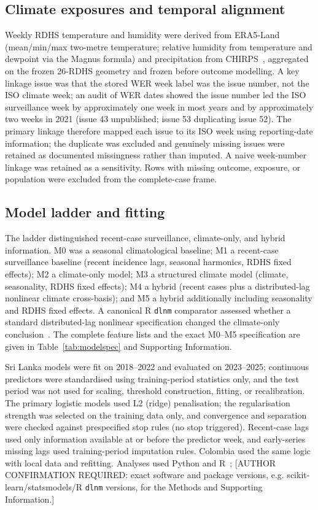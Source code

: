 \documentclass[11pt,a4paper]{article}
\begin{document}
\subsection{Climate exposures and temporal alignment}
Weekly RDHS temperature and humidity were derived from ERA5-Land~\cite{MunozSabater2021,ERA5LandCDS} (mean/min/max two-metre temperature; relative humidity from temperature and dewpoint via the Magnus formula) and precipitation from CHIRPS~\cite{Funk2015,CHIRPS}, aggregated on the frozen 26-RDHS geometry and frozen before outcome modelling. A key linkage issue was that the stored WER week label was the issue number, not the ISO climate week; an audit of WER dates showed the issue number led the ISO surveillance week by approximately one week in most years and by approximately two weeks in 2021 (issue 43 unpublished; issue 53 duplicating issue 52). The primary linkage therefore mapped each issue to its ISO week using reporting-date information; the duplicate was excluded and genuinely missing issues were retained as documented missingness rather than imputed. A naive week-number linkage was retained as a sensitivity. Rows with missing outcome, exposure, or population were excluded from the complete-case frame.

\subsection{Model ladder and fitting}
The ladder distinguished recent-case surveillance, climate-only, and hybrid information. M0 was a seasonal climatological baseline; M1 a recent-case surveillance baseline (recent incidence lags, seasonal harmonics, RDHS fixed effects); M2 a climate-only model; M3 a structured climate model (climate, seasonality, RDHS fixed effects); M4 a hybrid (recent cases plus a distributed-lag nonlinear climate cross-basis); and M5 a hybrid additionally including seasonality and RDHS fixed effects. A canonical R \texttt{dlnm} comparator assessed whether a standard distributed-lag nonlinear specification changed the climate-only conclusion~\cite{Gasparrini2010,Gasparrini2011}. The complete feature lists and the exact M0--M5 specification are given in Table~\ref{tab:modelspec} and Supporting Information.

Sri Lanka models were fit on 2018--2022 and evaluated on 2023--2025; continuous predictors were standardised using training-period statistics only, and the test period was not used for scaling, threshold construction, fitting, or recalibration. The primary logistic models used L2 (ridge) penalisation; the regularisation strength was selected on the training data only, and convergence and separation were checked against prespecified stop rules (no stop triggered). Recent-case lags used only information available at or before the predictor week, and early-series missing lags used training-period imputation rules. Colombia used the same logic with local data and refitting. Analyses used Python and R~\cite{RCoreTeam2024}; [AUTHOR CONFIRMATION REQUIRED: exact software and package versions, e.g. scikit-learn/statsmodels/R \texttt{dlnm} versions, for the Methods and Supporting Information.]
\end{document}
